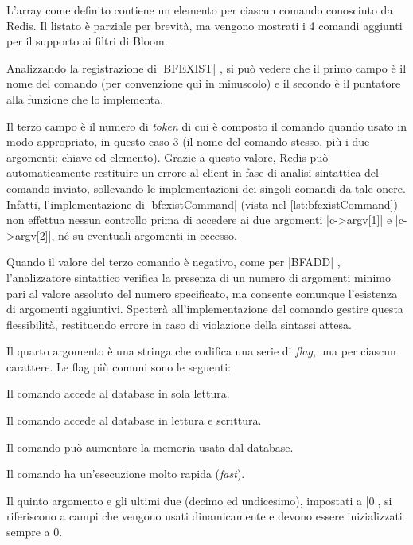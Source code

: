 L'array come definito contiene un elemento per ciascun comando conosciuto da Redis. Il listato è
parziale per brevità, ma vengono mostrati i 4 comandi aggiunti per il supporto ai filtri di Bloom.

Analizzando la registrazione di \cverb|BFEXIST| , si può vedere che il primo campo è il nome
del comando (per convenzione qui in minuscolo) e il secondo è il puntatore alla funzione che lo
implementa.

Il terzo campo è il numero di \emph{token} di cui è composto il comando quando usato in modo
appropriato, in questo caso $3$ (il nome del comando stesso, più i due argomenti: chiave ed
elemento). Grazie a questo valore, Redis può automaticamente restituire un errore al client in fase
di analisi sintattica del comando inviato, sollevando le implementazioni dei singoli comandi da tale
onere. Infatti, l'implementazione di \cverb|bfexistCommand| (vista nel \autoref{lst:bfexistCommand})
non effettua nessun controllo prima di accedere ai due argomenti \cverb|c->argv[1]| e
\cverb|c->argv[2]|, né su eventuali argomenti in eccesso.

Quando il valore del terzo comando è negativo, come per \cverb|BFADD| , l'analizzatore
sintattico verifica la presenza di un numero di argomenti minimo pari al valore assoluto del numero
specificato, ma consente comunque l'esistenza di argomenti aggiuntivi. Spetterà all'implementazione
del comando gestire questa flessibilità, restituendo errore in caso di violazione della sintassi
attesa.

Il quarto argomento è una stringa che codifica una serie di \emph{flag}, una per ciascun carattere.
Le flag più comuni sono le seguenti:

\begin{description}[labelindent=2\parindent,leftmargin=!,labelwidth=2em,font={\bfseries\ttfamily}]
  \item[r] Il comando accede al database in sola lettura.
  \item[w] Il comando accede al database in lettura e scrittura.
  \item[m] Il comando può aumentare la memoria usata dal database.
  \item[F] Il comando ha un'esecuzione molto rapida (\emph{fast}).
\end{description}

Il quinto argomento e gli ultimi due (decimo ed undicesimo), impostati a \cverb|0|, si riferiscono 
a campi che vengono usati dinamicamente e devono essere inizializzati sempre a $0$.

